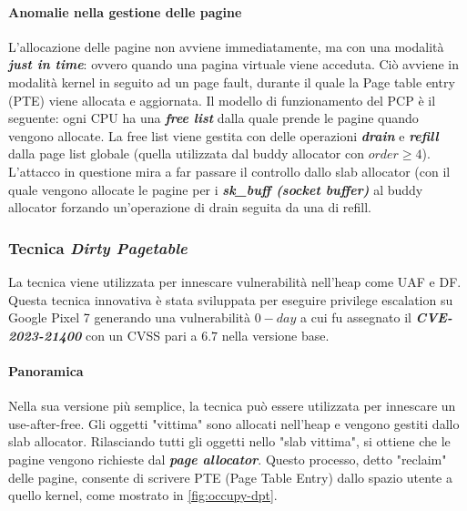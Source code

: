 \documentclass{article}
\begin{document}
\paragraph{Anomalie nella gestione delle pagine} L'allocazione delle pagine non avviene 
immediatamente, ma con una modalità \textbf{\textit{just in time}}: ovvero quando una pagina 
virtuale viene acceduta. Ciò avviene in modalità kernel in seguito ad un page fault, durante 
il quale la Page table entry (PTE) viene allocata e aggiornata. Il modello di funzionamento del 
PCP è il seguente: ogni CPU ha una \textbf{\textit{free list}} dalla quale prende le pagine 
quando vengono allocate. La free list viene gestita con delle operazioni \textbf{\textit{drain}} e 
\textbf{\textit{refill}} dalla page list globale (quella utilizzata dal buddy allocator con 
$order \geq 4$). L'attacco in questione mira a far passare il controllo dallo slab allocator
(con il quale vengono allocate le pagine per i \textbf{\textit{sk\_buff (socket buffer)}} al 
buddy allocator forzando un'operazione di drain seguita da una di refill.

\clearpage

\subsubsection{Tecnica \textit{Dirty Pagetable}} 
La tecnica viene utilizzata per innescare vulnerabilità nell'heap come UAF e DF. Questa 
tecnica innovativa è stata sviluppata per eseguire privilege escalation su Google Pixel 7 
generando una vulnerabilità $0-day$ a cui fu assegnato il \textbf{\textit{CVE-2023-21400}}
con un CVSS pari a $6.7$ nella versione base\cite{DirtyPageTable}. 

\paragraph{Panoramica} Nella sua versione più semplice, la tecnica può essere utilizzata per 
innescare un use-after-free. Gli oggetti "vittima" sono allocati nell'heap e vengono gestiti 
dallo slab allocator. Rilasciando tutti gli oggetti nello "slab vittima", si ottiene che le 
pagine vengono richieste dal \textbf{\textit{page allocator}}. Questo processo, 
detto "reclaim" delle pagine, consente di scrivere PTE (Page Table Entry) dallo spazio 
utente a quello kernel, come mostrato in \cref{fig:occupy-dpt}.
\end{document}
